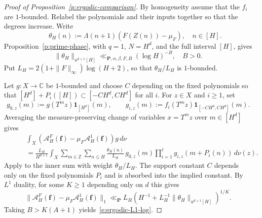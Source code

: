 \documentclass[12pt]{amsart}
\newcommand{\1}{\mathbf 1}
\theoremstyle{definition}
\begin{document}
\begin{proof}[Proof of Proposition~\ref{p:ergodic-comparison}]
By homogeneity assume that the \(f_i\) are \(1\)-bounded. Relabel the
polynomials and their inputs together so that the degrees increase. Write
$$  \qquad \theta_H(n):=\Lambda(n+1)(F(Z(n))-\mu_F), \quad n\in [H].$$
Proposition~\ref{p:prime-phase}, with \(q=1\), \(N=H^d\), and
the full interval \([H]\), gives
\[\|\theta_H\|_{u^{d+1}[H]}\ll_{\mathbf P,\alpha,\beta,F,B}(\log H)^{-B}, \quad B>0.\] 
Put
\(L_H=2(1+\|F\|_\infty)\log(H+2)\), so that \(\theta_H/L_H\)
is \(1\)-bounded.

Let \(g:X\to\mathbb C\) be \(1\)-bounded and choose \(C\) depending
on the fixed polynomials so that \([H^d]+P_i([H])\subset[-CH^d,CH^d]\)
for all \(i\). For \(z\in X\) and \(i\ge1\), set
\[g_{0,z}(m):=g(T^m z)\mathbf1_{[H^d]}(m),\qquad g_{i,z}(m):=f_i(T^m z)\mathbf1_{[-CH^d,CH^d]}(m).\] 
Averaging the measure-preserving change of variables \(x=T^m z\) over \(m\in[H^d]\) gives
\begin{align*}
 &\int_X (\mathcal A_H^F(\mathbf f)-\mu_F\mathcal A_H^1(\mathbf f))g\,d\nu\\
 \qquad &=\frac{L_H}{H^{d+1}}\int_X
    \sum_{m\in\mathbb Z}\sum_{n\le H}
       \frac{\theta_H(n)}{L_H}\,
       g_{0,z}(m)\prod_{i=1}^{\ell}g_{i,z}(m+P_i(n))\,d\nu(z).
\end{align*}
Apply \cite[Theorem~4.1]{Teravainen} to the inner sum with weight
$\theta_H/L_H$. The support constant $C$ depends only on the
fixed polynomials $P_i$ and is absorbed into the implied constant.
 By \(L^1\) duality, for some \(K\ge1\) depending
only on \(d\) this gives
\[
 \|\mathcal A_H^F(\mathbf f)-\mu_F\mathcal A_H^1(\mathbf f)\|_1\ll_{\mathbf P}
 L_H\left(H^{-1}+L_H^{-1}\|\theta_H\|_{u^{d+1}[H]}\right)^{1/K}.
\]
Taking \(B>K(A+1)\) yields~\eqref{e:ergodic-L1-log}.


\end{proof}
\end{document}
